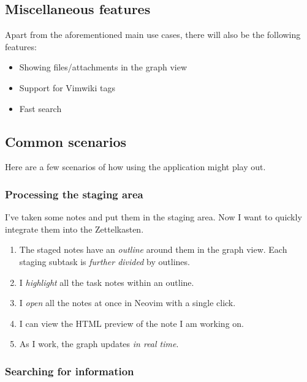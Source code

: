 \documentclass{article}
\begin{document}
\subsection{Miscellaneous features}

Apart from the aforementioned main use cases, there will also be the following features:

\begin{itemize}
	\item Showing files/attachments in the graph view

	\item Support for Vimwiki tags

	\item Fast search
\end{itemize}

\subsection{Common scenarios} %

Here are a few scenarios of how using the application might play out.

\subsubsection{Processing the staging area}

I've taken some notes and put them in the staging area. Now I want to quickly integrate them into the Zettelkasten.

\begin{enumerate}
	\item The staged notes have an \emph{outline} around them in the graph view. Each staging subtask is \emph{further divided} by outlines.

	\item I \emph{highlight} all the task notes within an outline.

	\item I \emph{open} all the notes at once in Neovim with a single click.

	\item I can view the HTML preview of the note I am working on.

	\item As I work, the graph updates \emph{in real time}.
\end{enumerate}

\subsubsection{Searching for information}
\end{document}
